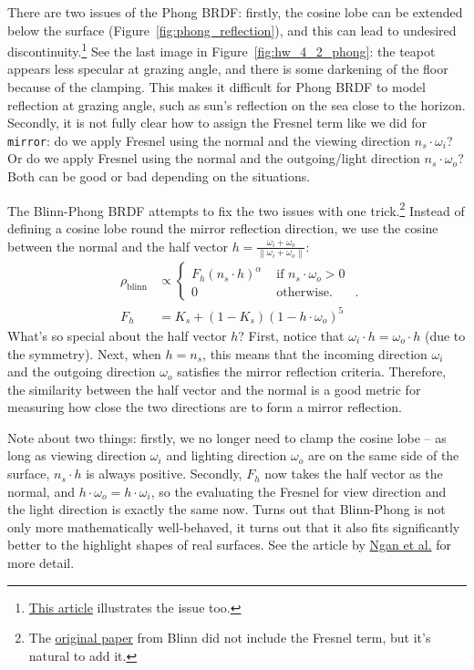 There are two issues of the Phong BRDF: firstly, the cosine lobe can be extended below the surface (Figure~\ref{fig:phong_reflection}), and this can lead to undesired discontinuity.\footnote{\href{https://learnopengl.com/Advanced-Lighting/Advanced-Lighting}{This article} illustrates the issue too.} See the last image in Figure~\ref{fig:hw_4_2_phong}: the teapot appears less specular at grazing angle, and there is some darkening of the floor because of the clamping. This makes it difficult for Phong BRDF to model reflection at grazing angle, such as sun's reflection on the sea close to the horizon.
Secondly, it is not fully clear how to assign the Fresnel term like we did for \lstinline{mirror}: do we apply Fresnel using the normal and the viewing direction $n_s \cdot \omega_i$? Or do we apply Fresnel using the normal and the outgoing/light direction $n_s \cdot \omega_o$? Both can be good or bad depending on the situations.

The Blinn-Phong BRDF attempts to fix the two issues with one trick.\footnote{The \href{https://dl.acm.org/doi/10.1145/360349.360353}{original paper} from Blinn did not include the Fresnel term, but it's natural to add it.} 
Instead of defining a cosine lobe round the mirror reflection direction, we use the cosine between the normal and the half vector $h = \frac{\omega_i + \omega_o}{\left\|\omega_i + \omega_o\right\|}$:
\begin{equation}
\begin{aligned}
\rho_{\text{blinn}} &\propto \begin{cases}
F_h \left(n_s \cdot h\right)^{\alpha} & \text{ if } n_s \cdot \omega_o > 0 \\
0 & \text{ otherwise.} 
\end{cases} \\
F_h &= K_s + (1 - K_s) (1 - h \cdot \omega_o)^5
\label{eq:schilick_fresnel}
\end{aligned}.
\end{equation}
What's so special about the half vector $h$? First, notice that $\omega_i \cdot h = \omega_o \cdot h$ (due to the symmetry). Next, when $h = n_s$, this means that the incoming direction $\omega_i$ and the outgoing direction $\omega_o$ satisfies the mirror reflection criteria. Therefore, the similarity between the half vector and the normal is a good metric for measuring how close the two directions are to form a mirror reflection.

Note about two things: firstly, we no longer need to clamp the cosine lobe -- as long as viewing direction $\omega_i$ and lighting direction $\omega_o$ are on the same side of the surface, $n_s \cdot h$ is always positive. Secondly, $F_h$ now takes the half vector as the normal, and $h \cdot \omega_o = h \cdot \omega_i$, so the evaluating the Fresnel for view direction and the light direction is exactly the same now. 
Turns out that Blinn-Phong is not only more mathematically well-behaved, it turns out that it also fits significantly better to the highlight shapes of real surfaces. See the article by \href{http://people.csail.mit.edu/addy/research/brdf/index.html}{Ngan et al.} for more detail.

